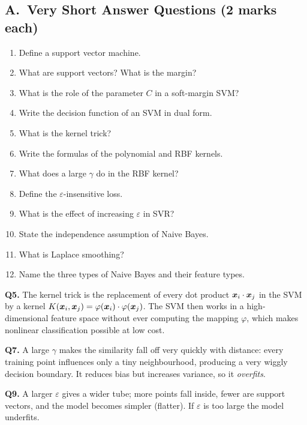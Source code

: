 \subsection*{A.\ Very Short Answer Questions (2 marks each)}
\begin{enumerate}
  \item Define a support vector machine. 
  \item What are support vectors? What is the margin? 
  \item What is the role of the parameter $C$ in a soft-margin SVM? 
  \item Write the decision function of an SVM in dual form. 
  \item What is the kernel trick? 
  \item Write the formulas of the polynomial and RBF kernels. 
  \item What does a large $\gamma$ do in the RBF kernel? 
  \item Define the $\varepsilon$-insensitive loss. 
  \item What is the effect of increasing $\varepsilon$ in SVR? 
  \item State the independence assumption of Naive Bayes. 
  \item What is Laplace smoothing? 
  \item Name the three types of Naive Bayes and their feature types. 
\end{enumerate}

\begin{modelans}[: Q5, Q7 and Q9]
\textbf{Q5.} The kernel trick is the replacement of every dot product $\boldsymbol{x}_i\cdot\boldsymbol{x}_j$ in the SVM by a kernel $K(\boldsymbol{x}_i,\boldsymbol{x}_j)=\varphi(\boldsymbol{x}_i)\cdot\varphi(\boldsymbol{x}_j)$. The SVM then works in a high-dimensional feature space without ever computing the mapping $\varphi$, which makes nonlinear classification possible at low cost.\par
\textbf{Q7.} A large $\gamma$ makes the similarity fall off very quickly with distance: every training point influences only a tiny neighbourhood, producing a very wiggly decision boundary. It reduces bias but increases variance, so it \emph{overfits}.\par
\textbf{Q9.} A larger $\varepsilon$ gives a wider tube; more points fall inside, fewer are support vectors, and the model becomes simpler (flatter). If $\varepsilon$ is too large the model underfits.
\end{modelans}


